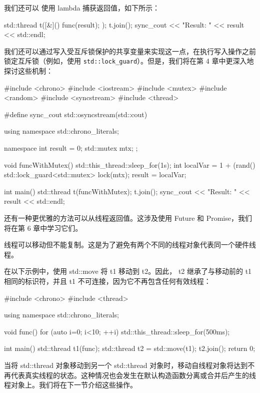 我们还可以 使用 lambda 捕获返回值，如下所示：

\begin{cpp}
std::thread t([&]() { func(result); });
t.join();
sync_cout << "Result: " << result << std::endl;
\end{cpp}

我们还可以通过写入受互斥锁保护的共享变量来实现这一点，在执行写入操作之前锁定互斥锁（例如，使用 \verb|std::lock_guard|）。但是，我们将在第 4 章中更深入地探讨这些机制：

\begin{cpp}
#include <chrono>
#include <iostream>
#include <mutex>
#include <random>
#include <syncstream>
#include <thread>

#define sync_cout std::osyncstream(std::cout)

using namespace std::chrono_literals;

namespace {
    int result = 0;
    std::mutex mtx;
};

void funcWithMutex() {
    std::this_thread::sleep_for(1s);
    int localVar = 1 + (rand() %
    std::lock_guard<std::mutex> lock(mtx);
    result = localVar;
}

int main() {
    std::thread t(funcWithMutex);
    t.join();
    sync_cout << "Result: " << result << std::endl;
}
\end{cpp}

还有一种更优雅的方法可以从线程返回值。这涉及使用 Future 和 Promise，我们将在第 6 章中学习它们。


线程可以移动但不能复制。这是为了避免有两个不同的线程对象代表同一个硬件线程。

在以下示例中，使用 std::move 将 t1 移动到 t2。因此， t2 继承了与移动前的 t1 相同的标识符，并且 t1 不可连接，因为它不再包含任何有效线程：

\begin{cpp}
#include <chrono>
#include <thread>

using namespace std::chrono_literals;

void func() {
    for (auto i=0; i<10; ++i) {
        std::this_thread::sleep_for(500ms);
    }
}

int main() {
    std::thread t1(func);
    std::thread t2 = std::move(t1);
    t2.join();
    return 0;
}
\end{cpp}

当将 std::thread 对象移动到另一个 std::thread 对象时，移动自线程对象将达到不再代表真实线程的状态。这种情况也会发生在默认构造函数分离或合并后产生的线程对象上。我们将在下一节介绍这些操作。

